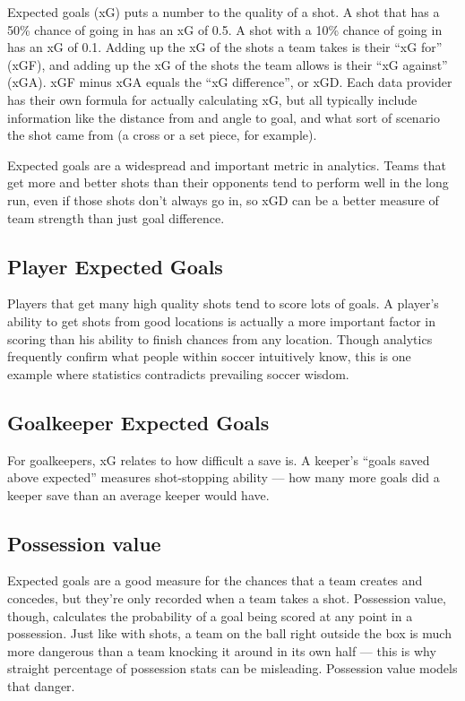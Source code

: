 Expected goals (xG) puts a number to the quality of a shot. A shot that has 
a 50\% chance of going in has an xG of 0.5. A shot with a 10\% chance of going 
in has an xG of 0.1. Adding up the xG of the shots a team takes is their “xG 
for” (xGF), and adding up the xG of the shots the team allows is their “xG 
against” (xGA). xGF minus xGA equals the “xG difference”, or xGD. Each data 
provider has their own formula for actually calculating xG, but all typically 
include information like the distance from and angle to goal, and what sort 
of scenario the shot came from (a cross or a set piece, for example).

Expected goals are a widespread and important metric in analytics. Teams 
that get more and better shots than their opponents tend to perform well in 
the long run, even if those shots don’t always go in, so xGD can be a better 
measure of team strength than just goal difference. 

\subsection{Player Expected Goals}
Players that get many high quality shots tend to score lots of goals. A 
player’s ability to get shots from good locations is actually a more 
important factor in scoring than his ability to finish chances from any 
location. Though analytics frequently confirm what people within soccer 
intuitively know, this is one example where statistics contradicts 
prevailing soccer wisdom.

\subsection{Goalkeeper Expected Goals}
For goalkeepers, xG relates to how difficult a save is. A keeper’s “goals 
saved above expected” measures shot-stopping ability — how many more goals 
did a keeper save than an average keeper would have.

\subsection{Possession value}
Expected goals are a good measure for the chances that a team creates and 
concedes, but they’re only recorded when a team takes a shot. Possession 
value, though, calculates the probability of a goal being scored at any 
point in a possession. Just like with shots, a team on the ball right 
outside the box is much more dangerous than a team knocking it around in 
its own half — this is why straight percentage of possession stats can be 
misleading. Possession value models that danger.


